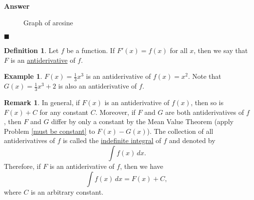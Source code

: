 \documentclass[12pt,letterpaper]{book}
\numberwithin{equation}{section}
\theoremstyle{definition}
\newtheorem{defi}[thm]{\textbf{Definition}}
\newtheorem{example}[thm]{\textbf{Example}}
\newtheorem{remark}[thm]{\textbf{Remark}}
\newenvironment{answer}{\noindent\textbf{Answer}}{\hfill$\blacksquare$\vspace{0.1in}}
\begin{document}
\begin{answer}
\begin{enumerate}
\begin{figure}[h]
\begin{center}
\caption{Graph of arcsine}
\label{arcsine}
\end{center}
\end{figure}

\end{enumerate}
\end{answer}

\begin{defi} Let $f$ be a function. If $F'(x)=f(x)$ for all $x$, then we say that $F$ is an \underline{antiderivative} of $f$.
\end{defi}

\begin{example} $F(x)=\frac{1}{3}x^3$ is an antiderivative of $f(x)=x^2$. Note that $G(x)=\frac{1}{3}x^3+2$ is also an antiderivative of $f$.
\end{example}

\begin{remark} In general, if $F(x)$ is an antiderivative of $f(x)$, then so is $F(x)+C$ for any constant $C$. Moreover, if $F$ and $G$ are both antiderivatives of $f$, then $F$ and $G$ differ by only a constant by the Mean Value Theorem (apply Problem \ref{must be constant} to $F(x)-G(x)$). The collection of all antiderivatives of $f$ is called the \underline{indefinite integral} of $f$ and denoted by $$\int f(x)\,dx.$$ Therefore, if $F$ is an antiderivative of $f$, then we have
$$\int f(x)\,dx = F(x) +C,$$
where $C$ is an arbitrary constant.
\end{remark}
\end{document}
